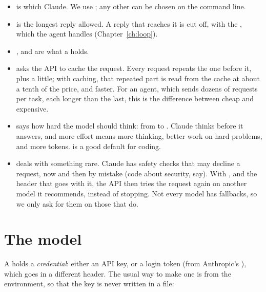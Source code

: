 \begin{itemize}
\item {} is which Claude. We use ; any
  other can be chosen on the command line.
\item {} is the longest reply allowed. A reply that reaches
  it is cut off, with the  , which the
  agent handles (Chapter~\ref{ch:loop}).
\item {},  and  are what a
   holds.
\item {} asks the API to cache the request. Every
  request repeats the one before it, plus a little; with caching, that
  repeated part is read from the cache at about a tenth of the price, and
  faster. For an agent, which sends dozens of requests per task, each
  longer than the last, this is the difference between cheap and
  expensive.
\item {} says how hard the model should think:
  from  to . Claude thinks before it answers, and more
  effort means more thinking, better work on hard problems, and more
  tokens.  is a good default for coding.
\item {} deals with something rare. Claude has safety checks
  that may decline a request, now and then by mistake (code about
  security, say). With , and the
   header that goes with it, the API then tries the
  request again on another model it recommends, instead of stopping. Not
  every model has fallbacks, so we only ask for them on those that do.
\end{itemize}

\section{The model}

A  holds a \emph{credential}: either an API key, or a
login token (from Anthropic's ), which goes in a
different header. The usual way to make one is from the environment, so
that the key is never written in a file:


